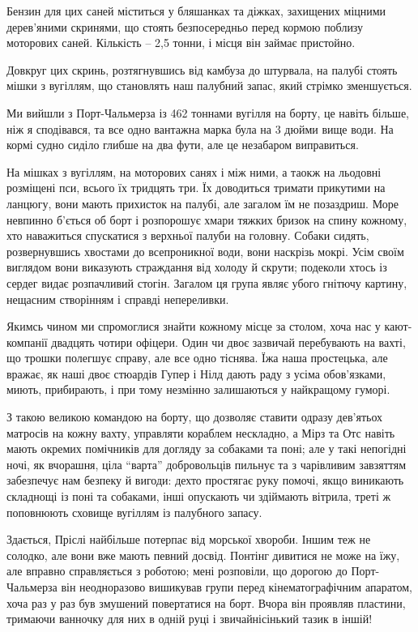 Бензин для цих саней міститься у бляшанках та діжках, захищених міцними
дерев’яними скринями, що стоять безпосередньо перед кормою поблизу моторових
саней. Кількість – 2,5 тонни, і місця він займає пристойно.

Довкруг цих скринь, розтягнувшись від камбуза до штурвала, на палубі стоять
мішки з вугіллям, що становлять наш палубний запас, який стрімко зменшується.

Ми вийшли з Порт-Чальмерза із 462 тоннами вугілля на борту, це навіть більше,
ніж я сподівався, та все одно вантажна марка була на 3 дюйми вище води. На
кормі судно сиділо глибше на два фути, але це незабаром виправиться. 

На мішках з вугіллям, на моторових санях і між ними, а таокж на льодовні
розміщені пси, всього їх тридцять три. Їх доводиться тримати прикутими на
ланцюгу, вони мають прихисток на палубі, але загалом їм не позаздриш. Море
невпинно б’ється об борт і розпорошує хмари тяжких бризок на спину кожному, хто
наважиться спускатися з верхньої палуби на головну. Собаки сидять,
розвернувшись хвостами до всепроникної води, вони наскрізь мокрі. Усім своїм
виглядом вони виказують страждання від холоду й скрути; подеколи хтось із
сердег видає розпачливий стогін. Загалом ця група являє убого гнітючу картину,
нещасним створінням і справді непереливки.

Якимсь чином ми спромоглися знайти кожному місце за столом, хоча нас у
кают-компанії двадцять чотири офіцери. Один чи двоє зазвичай перебувають на
вахті, що трошки полегшує справу, але все одно тіснява. Їжа наша простецька,
але вражає, як наші двоє стюардів Гупер і Нілд дають раду з усіма обов’язками,
миють, прибирають, і при тому незмінно залишаються у найкращому гуморі.

З такою великою командою на борту, що дозволяє ставити одразу дев’ятьох
матросів на кожну вахту, управляти кораблем нескладно, а Мірз та Отс навіть
мають окремих помічників для догляду за собаками та поні; але у такі непогідні
ночі, як вчорашня, ціла \enquote{варта} добровольців пильнує та з чарівливим завзяттям
забезпечує нам безпеку й вигоди: дехто простягає руку помочі, якщо виникають
складнощі із поні та собаками, інші опускають чи здіймають вітрила, треті ж
поповнюють сховище вугіллям із палубного запасу.

Здається, Пріслі найбільше потерпає від морської хвороби. Іншим теж не солодко,
але вони вже мають певний досвід. Понтінг дивитися не може на їжу, але вправно
справляється з роботою; мені розповіли, що дорогою до Порт-Чальмерза він
неодноразово вишикував групи перед кінематографічним апаратом, хоча раз у раз
був змушений повертатися на борт. Вчора він проявляв пластини, тримаючи
ванночку для них в одній руці і звичайнісінький тазик в іншій!

